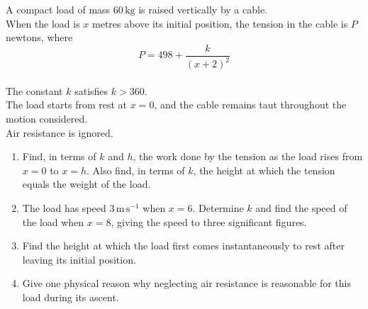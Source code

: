 \documentclass[leqno]{article}
\begin{document}
\begin{enumerate}[
  label=\textbf{\arabic*.},
  leftmargin=*,
  topsep=0pt,
  partopsep=0pt,
  parsep=0pt
]
A compact load of mass $60\,\mathrm{kg}$ is raised vertically by a cable. \\
When the load is $x$ metres above its initial position, the tension in the cable is $P$ newtons, where
\[
P=498+\frac{k}{(x+2)^2}
\] \\
The constant $k$ satisfies $k>360$. \\
The load starts from rest at $x=0$, and the cable remains taut throughout the motion considered. \\
Air resistance is ignored. \\
\begin{enumerate}[label=\textbf{(\alph*)}]
\item Find, in terms of $k$ and $h$, the work done by the tension as the load rises from $x=0$ to $x=h$. Also find, in terms of $k$, the height at which the tension equals the weight of the load.  \\
\item The load has speed $3\,\mathrm{m\,s^{-1}}$ when $x=6$. Determine $k$ and find the speed of the load when $x=8$, giving the speed to three significant figures.  \\
\item Find the height at which the load first comes instantaneously to rest after leaving its initial position.  \\
\item Give one physical reason why neglecting air resistance is reasonable for this load during its ascent.  \\
\end{enumerate}

\newpage

\questionitem

\begin{figure}[H]
    \centering
{}
\end{figure}



\end{enumerate}
\end{document}
